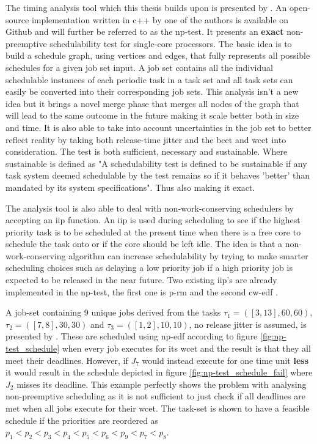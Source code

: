\documentclass{kththesis}
\begin{document}
The timing analysis tool which this thesis builds upon is presented by \textcite{nasri_exact_2017}. An open-source
implementation written in c++ by one of the authors is available on
Github \parencite{brandenburg_implementation_2018} and will further be referred to as the
\acrfull{np}-test. It presents an \textbf{exact} non-preemptive schedulability test for single-core
processors. The basic idea is to build a schedule graph, using vertices and edges, that fully
represents all possible schedules for a given job set input. A job set contains all the individual
schedulable instances of each periodic task in a task set and all task sets can easily be converted into
their corresponding job sets. This analysis isn't a new idea but it brings a novel merge phase that
merges all nodes of the graph that will lead to the same outcome in the future making it scale better
both in size and time. It is also able to take into account uncertainties in the job set to better
reflect reality by taking both release-time jitter and the \acrshort{bcet} and \acrshort{wcet} into
consideration. The test is both sufficient, necessary and sustainable. Where sustainable is defined
as "A schedulability test is defined to be sustainable if any task system deemed schedulable by the
test remains so if it behaves 'better' than mandated by its system
specifications"\parencite{baruah_sustainable_2006}. Thus also making it exact.

The analysis tool is also able to deal with non-work-conserving schedulers by accepting an
\acrshort{iip} function. An \acrfull{iip} is used during scheduling to see if the highest priority
task is to be scheduled at the present time when there is a free core to schedule the task onto or
if the core should be left idle. The idea is that a non-work-conserving algorithm can increase
schedulability by trying to make smarter scheduling choices such as delaying a low priority job if a
high priority job is expected to be released in the near future. Two existing \acrshort{iip}'s are
already implemented in the \acrshort{np}-test, the first one is \acrfull{p-rm}
\parencite{nasri_precautious-rm:_2014} and the second \acrfull{cw-edf}
\parencite{nasri_non-work-conserving_2016}.

A job-set containing 9 unique jobs derived from the tasks $\tau_1=([3,13], 60, 60)$, $\tau_2=([7,
8], 30, 30)$ and $\tau_3=([1,2], 10, 10)$, no release jitter is assumed, is presented by
\textcite{nasri_exact_2017}. These are scheduled using \acrshort{np}-\acrshort{edf} according to figure \ref{fig:np-test_schedule}
when every job executes for its \acrshort{wcet} and the result is that they all meet their
deadlines. However, if $J_7$ would instead execute for one time unit \textbf{less} it would result in the
schedule depicted in figure \ref{fig:np-test_schedule_fail} where $J_2$ misses its deadline. This
example perfectly shows the problem with analysing non-preemptive scheduling as it is not sufficient
to just check if all deadlines are met when all jobs execute for their \acrshort{wcet}. The task-set
is shown to have a feasible schedule if the priorities are reordered as $ p_1 < p_2 < p_3 < p_4 < p_5 < p_6 <
p_9 < p_7 < p_8$.
\end{document}
